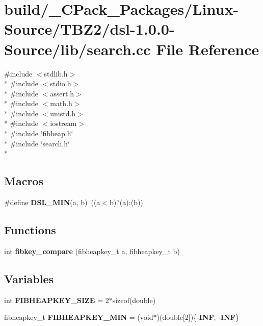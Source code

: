 \section{build/\-\_\-\-C\-Pack\-\_\-\-Packages/\-Linux-\/\-Source/\-T\-B\-Z2/dsl-\/1.0.0-\/\-Source/lib/search.cc File Reference}
\label{build_2__CPack__Packages_2Linux-Source_2TBZ2_2dsl-1_80_80-Source_2lib_2search_8cc}
{\ttfamily \#include $<$stdlib.\-h$>$}\\*
{\ttfamily \#include $<$stdio.\-h$>$}\\*
{\ttfamily \#include $<$assert.\-h$>$}\\*
{\ttfamily \#include $<$math.\-h$>$}\\*
{\ttfamily \#include $<$unistd.\-h$>$}\\*
{\ttfamily \#include $<$iostream$>$}\\*
{\ttfamily \#include \char`\"{}fibheap.\-h\char`\"{}}\\*
{\ttfamily \#include \char`\"{}search.\-h\char`\"{}}\\*
\subsection*{Macros}
\begin{DoxyCompactItemize}
\item 
\#define {\bf D\-S\-L\-\_\-\-M\-I\-N}(a, b)~((a$<$b)?(a)\-:(b))
\end{DoxyCompactItemize}
\subsection*{Functions}
\begin{DoxyCompactItemize}
\item 
int {\bf fibkey\-\_\-compare} (fibheapkey\-\_\-t a, fibheapkey\-\_\-t b)
\end{DoxyCompactItemize}
\subsection*{Variables}
\begin{DoxyCompactItemize}
\item 
int {\bf F\-I\-B\-H\-E\-A\-P\-K\-E\-Y\-\_\-\-S\-I\-Z\-E} = 2$\ast$sizeof(double)
\item 
fibheapkey\-\_\-t {\bf F\-I\-B\-H\-E\-A\-P\-K\-E\-Y\-\_\-\-M\-I\-N} = (void$\ast$)(double[2])\{-\/{\bf I\-N\-F}, -\/{\bf I\-N\-F}\}
\end{DoxyCompactItemize}


